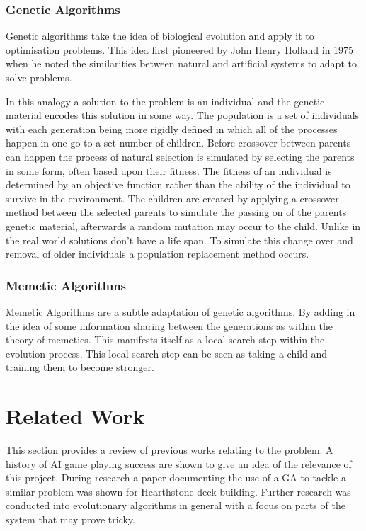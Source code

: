 \documentclass[a4paper]{article}
\begin{document}
\subsubsection{Genetic Algorithms}
Genetic algorithms take the idea of biological evolution and apply it to optimisation problems.
This idea first pioneered by John Henry Holland in 1975 when he noted the similarities between natural and artificial systems to adapt to solve problems.
\par
In this analogy a solution to the problem is an individual and the genetic material encodes this solution in some way.
The population is a set of individuals with each generation being more rigidly defined in which all of the processes happen in one go to a set number of children.
Before crossover between parents can happen the process of natural selection is simulated by selecting the parents in some form, often based upon their fitness.
The fitness of an individual is determined by an objective function rather than the ability of the individual to survive in the environment.
The children are created by applying a crossover method between the selected parents to simulate the passing on of the parents genetic material, afterwards a random mutation may occur to the child.
Unlike in the real world solutions don't have a life span.
To simulate this change over and removal of older individuals a population replacement method occurs.
\subsubsection{Memetic Algorithms}
Memetic Algorithms are a subtle adaptation of genetic algorithms.
By adding in the idea of some information sharing between the generations as within the theory of memetics.
This manifests itself as a local search step within the evolution process.
This local search step can be seen as taking a child and training them to become stronger.

\section{Related Work}
This section provides a review of previous works relating to the problem.
A history of AI game playing success are shown to give an idea of the relevance of this project.
During research a paper documenting the use of a GA to tackle a similar problem was shown for Hearthstone deck building.
Further research was conducted into evolutionary algorithms in general with a focus on parts of the system that may prove tricky.
\end{document}
